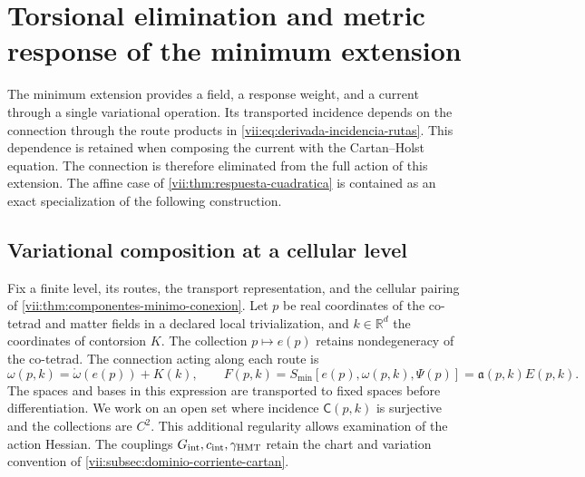
\section{Torsional elimination and metric response of the minimum extension}
\label{vii:sec:eliminacion-torsional-no-lineal}

The minimum extension provides a field, a response weight, and a
current through a single variational operation. Its transported
incidence depends on the connection through the route products in
\eqref{vii:eq:derivada-incidencia-rutas}. This dependence is retained
when composing the current with the Cartan--Holst equation. The
connection is therefore eliminated from the full action of this
extension. The affine case of
\ref{vii:thm:respuesta-cuadratica} is contained as an exact
specialization of the following construction.

\subsection{Variational composition at a cellular level}
\label{vii:subsec:composicion-torsional-celular}

Fix a finite level, its routes, the transport representation, and
the cellular pairing of
\ref{vii:thm:componentes-minimo-conexion}. Let \(p\) be real
coordinates of the co-tetrad and matter fields in a declared local
trivialization, and \(k\in\mathbb R^d\) the coordinates of
contorsion \(K\). The collection \(p\mapsto e(p)\) retains
nondegeneracy of the co-tetrad. The connection acting along each route is
\begin{equation}
 \omega(p,k)=\mathring\omega(e(p))+K(k),\qquad
 F(p,k)=S_{\min}[e(p),\omega(p,k),\Psi(p)]
       =\mathfrak a(p,k)E(p,k).
 \label{vii:eq:accion-minima-en-contorsion}
\end{equation}
The spaces and bases in this expression are transported to fixed
spaces before differentiation. We work on an open set where incidence
\(\mathsf C(p,k)\) is surjective and the collections are \(C^2\).
This additional regularity allows examination of the action Hessian.
The couplings \(G_{\rm int},c_{\rm int},\gamma_{\rm HMT}\)
retain the chart and variation convention of
\ref{vii:subsec:dominio-corriente-cartan}.


